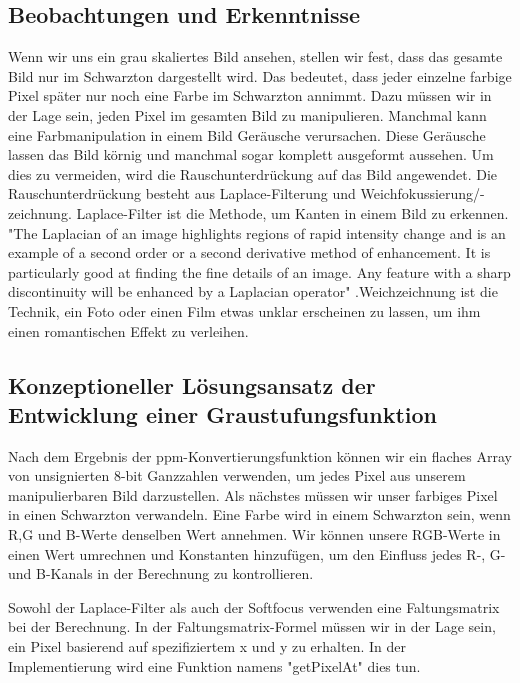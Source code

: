 \documentclass[course=asp]{aspdoc}
\begin{document}
\subsection{Beobachtungen und Erkenntnisse}
Wenn wir uns ein grau skaliertes Bild ansehen, stellen wir fest, dass das gesamte Bild nur im Schwarzton dargestellt wird. Das bedeutet, dass jeder einzelne farbige Pixel später nur noch eine Farbe im Schwarzton annimmt. Dazu müssen wir in der Lage sein, jeden Pixel im gesamten Bild zu manipulieren.
Manchmal kann eine Farbmanipulation in einem Bild Geräusche verursachen. Diese Geräusche lassen das Bild körnig und manchmal sogar komplett ausgeformt aussehen. Um dies zu vermeiden, wird die Rauschunterdrückung auf das Bild angewendet. Die Rauschunterdrückung besteht aus Laplace-Filterung und Weichfokussierung/-zeichnung. Laplace-Filter ist die Methode, um Kanten in einem Bild zu erkennen. "The Laplacian of an image highlights regions of rapid intensity change and is an example of a second order or a second derivative method of enhancement. It is particularly good at finding the fine details of an image. Any feature with a sharp discontinuity will be enhanced by a Laplacian operator" \cite{satu}.Weichzeichnung ist die Technik, ein Foto oder einen Film etwas unklar erscheinen zu lassen, um ihm einen romantischen Effekt zu verleihen\cite{mw:abulia}.

\subsection{Konzeptioneller Lösungsansatz der Entwicklung einer Graustufungsfunktion}
Nach dem Ergebnis der ppm-Konvertierungsfunktion können wir ein flaches Array von unsignierten 8-bit Ganzzahlen verwenden, um jedes Pixel aus unserem manipulierbaren Bild darzustellen. Als nächstes müssen wir unser farbiges Pixel in einen Schwarzton verwandeln. Eine Farbe wird in einem Schwarzton sein, wenn R,G und B-Werte denselben Wert annehmen. Wir können unsere RGB-Werte in einen Wert umrechnen und Konstanten hinzufügen, um den Einfluss jedes R-, G- und B-Kanals in der Berechnung zu kontrollieren.

Sowohl der Laplace-Filter als auch der Softfocus verwenden eine Faltungsmatrix bei der Berechnung. In der Faltungsmatrix-Formel müssen wir in der Lage sein, ein Pixel basierend auf spezifiziertem x und y zu erhalten. In der Implementierung wird eine Funktion namens "getPixelAt" dies tun.

\end{document}
